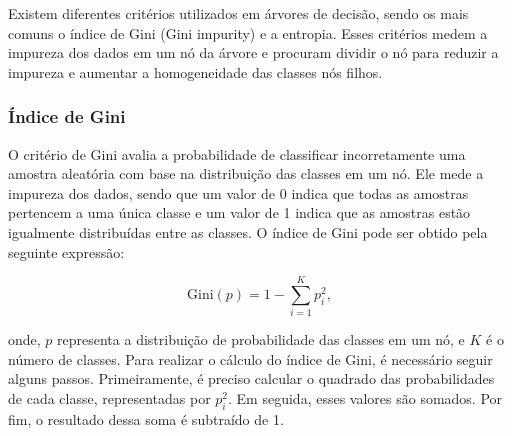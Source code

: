 \documentclass[12pt,oneside,a4paper,chapter=TITLE,
			   english,brazil]{abntex2}
\begin{document}
Existem diferentes critérios utilizados em árvores de decisão, sendo os mais comuns o índice de Gini (Gini impurity) e a entropia. Esses critérios medem a impureza dos dados em um nó da árvore e procuram dividir o nó para reduzir a impureza e aumentar a homogeneidade das classes nós filhos.





\subsubsection{Índice de Gini}

O critério de Gini avalia a probabilidade de classificar incorretamente uma amostra aleatória com base na distribuição das classes em um nó. Ele mede a impureza dos dados, sendo que um valor de 0 indica que todas as amostras pertencem a uma única classe e um valor de 1 indica que as amostras estão igualmente distribuídas entre as classes. O índice de Gini pode ser obtido pela seguinte expressão:


\begin{equation}
    \text{Gini}(p) = 1 - \sum_{i=1}^{K} p_i^2,
\end{equation}




 \noindent onde, $p$ representa a distribuição de probabilidade das classes em um nó,  %
e $K$ é o número de classes. Para realizar o cálculo do índice de Gini, é necessário seguir alguns passos. Primeiramente, é preciso calcular o quadrado das probabilidades de cada classe, representadas por $p_i^2$. Em seguida, esses valores são somados. Por fim, o resultado dessa soma é subtraído de 1.



\end{document}

